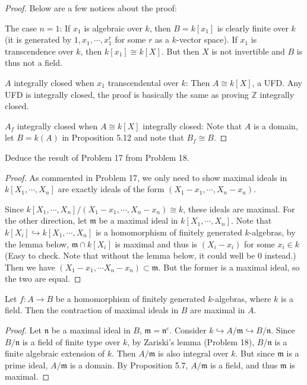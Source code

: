 \documentclass{solution}
\begin{document}
\begin{proof}
    Below are a few notices about the proof:

    The case $n = 1$: If $x_1$ is algebraic over $k$, then $B = k[x_1]$ is clearly finite over $k$ (it is generated by $1, x_1, \cdots, x_1^r$ for some $r$ as a $k$-vector space). If $x_1$ is transcendence over $k$, then $k[x_1] \cong k[X]$. But then $X$ is not invertible and $B$ is thus not a field.

    $A$ integrally closed when $x_1$ transcendental over $k$: Then $A \cong k[X]$, a UFD. Any UFD is integrally closed, the proof is basically the same as proving $\mathbb{Z}$ integrally closed.

    $A_f$ integrally closed when $A \cong k[X]$ integrally closed: Note that $A$ is a domain, let $B = k(A)$ in Proposition 5.12 and note that $B_f \cong B$.
\end{proof}

\begin{problem}
    Deduce the result of Problem 17 from Problem 18.
\end{problem}

\begin{proof}
    As commented in Problem 17, we only need to show maximal ideals in $k[X_1, \cdots, X_n]$ are exactly ideals of the form $(X_1 - x_1, \cdots, X_n - x_n)$.

    Since $k[X_1, \cdots, X_n] / (X_1 - x_1, \cdots, X_n - x_n) \cong k$, these ideals are maximal. For the other direction, let $\mathfrak{m}$ be a maximal ideal in $k[X_1, \cdots, X_n]$. Note that $k[X_i] \hookrightarrow k[X_1, \cdots, X_n]$ is a homomorphism of finitely generated $k$-algebras, by the lemma below, $\mathfrak{m} \cap k[X_i]$ is maximal and thus is $(X_i - x_i)$ for some $x_i \in k$(Easy to check. {\color{red} Note that without the lemma below, it could well be $0$ instead.}) Then we have $(X_1 - x_1, \cdots X_n - x_n) \subset \mathfrak{m}$. But the former is a maximal ideal, so the two are equal.
\end{proof}

\begin{lemma}
    Let $f: A \rightarrow B$ be a homomorphism of finitely generated $k$-algebras, where $k$ is a field. Then the contraction of maximal ideals in $B$ are maximal in $A$.
\end{lemma}

\begin{proof}
    Let $\mathfrak{n}$ be a maximal ideal in $B$, $\mathfrak{m} = \mathfrak{n}^c$. Consider $k \hookrightarrow A / \mathfrak{m} \hookrightarrow B / \mathfrak{n}$. Since $B / \mathfrak{n}$ is a field of finite type over $k$, by Zariski's lemma (Problem 18), $B / \mathfrak{n}$ is a finite algebraic extension of $k$. Then $A / \mathfrak{m}$ is also integral over $k$. But since $\mathfrak{m}$ is a prime ideal, $A / \mathfrak{m}$ is a domain. By Proposition 5.7, $A / \mathfrak{m}$ is a field, and thus $\mathfrak{m}$ is maximal.
\end{proof}
\end{document}
